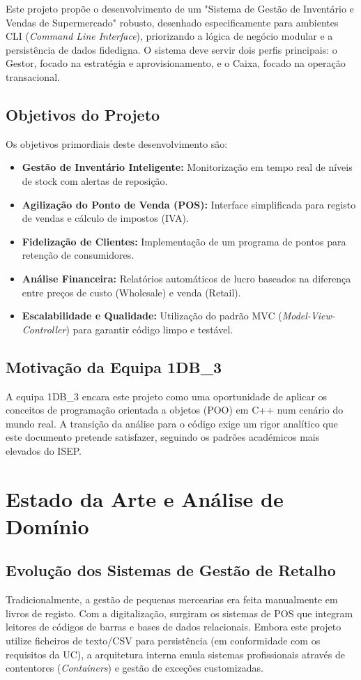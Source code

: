\documentclass[runningheads,a4paper]{llncs}
\begin{document}
Este projeto propõe o desenvolvimento de um "Sistema de Gestão de Inventário e Vendas de Supermercado" robusto, desenhado especificamente para ambientes CLI (\textit{Command Line Interface}), priorizando a lógica de negócio modular e a persistência de dados fidedigna. O sistema deve servir dois perfis principais: o Gestor, focado na estratégia e aprovisionamento, e o Caixa, focado na operação transacional.

\subsection{Objetivos do Projeto}
Os objetivos primordiais deste desenvolvimento são:
\begin{itemize}
    \item \textbf{Gestão de Inventário Inteligente:} Monitorização em tempo real de níveis de stock com alertas de reposição.
    \item \textbf{Agilização do Ponto de Venda (POS):} Interface simplificada para registo de vendas e cálculo de impostos (IVA).
    \item \textbf{Fidelização de Clientes:} Implementação de um programa de pontos para retenção de consumidores.
    \item \textbf{Análise Financeira:} Relatórios automáticos de lucro baseados na diferença entre preços de custo (Wholesale) e venda (Retail).
    \item \textbf{Escalabilidade e Qualidade:} Utilização do padrão MVC (\textit{Model-View-Controller}) para garantir código limpo e testável.
\end{itemize}

\subsection{Motivação da Equipa 1DB\_3}
A equipa 1DB\_3 encara este projeto como uma oportunidade de aplicar os conceitos de programação orientada a objetos (POO) em C++ num cenário do mundo real. A transição da análise para o código exige um rigor analítico que este documento pretende satisfazer, seguindo os padrões académicos mais elevados do ISEP.

\section{Estado da Arte e Análise de Domínio}

\subsection{Evolução dos Sistemas de Gestão de Retalho}
Tradicionalmente, a gestão de pequenas mercearias era feita manualmente em livros de registo. Com a digitalização, surgiram os sistemas de POS que integram leitores de códigos de barras e bases de dados relacionais. Embora este projeto utilize ficheiros de texto/CSV para persistência (em conformidade com os requisitos da UC), a arquitetura interna emula sistemas profissionais através de contentores (\textit{Containers}) e gestão de exceções customizadas.
\end{document}
